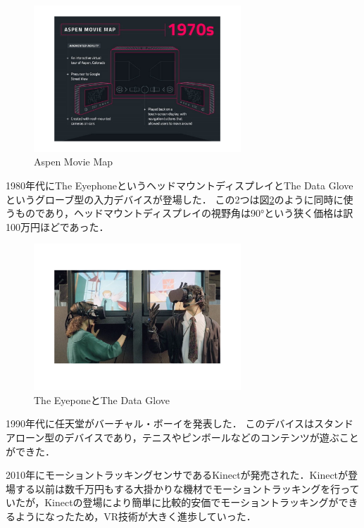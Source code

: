 \documentclass[12pt,a4j]{ltjsarticle}
\begin{document}
\begin{figure}[h]
\begin{center}
 \includegraphics[clip,height=55mm]{Aspen_Movie_Map.pdf}
\end{center}
 \caption{Aspen Movie Map}
 \label{fig:Aspen_Movie_Map.pdf}
\end{figure}

1980年代にThe EyephoneというヘッドマウントディスプレイとThe Data Gloveというグローブ型の入力デバイスが登場した．
この2つは図\ref{fig:The_Eyephone.pdf}のように同時に使うものであり，ヘッドマウントディスプレイの視野角は90°という狭く価格は訳100万円ほどであった\cite{VRの機材}．

\begin{figure}[h]
\begin{center}
 \includegraphics[clip,height=55mm]{The_Eyephone.pdf}
\end{center}
 \caption{The EyeponeとThe Data Glove}
 \label{fig:The_Eyephone.pdf}
\end{figure}

1990年代に任天堂がバーチャル・ボーイを発表した．
このデバイスはスタンドアローン型のデバイスであり，テニスやピンボールなどのコンテンツが遊ぶことができた\cite{VRの機材}．

2010年にモーショントラッキングセンサであるKinectが発売された．Kinectが登場する以前は数千万円もする大掛かりな機材でモーショントラッキングを行っていたが，Kinectの登場により簡単に比較的安価でモーショントラッキングができるようになったため，VR技術が大きく進歩していった\cite{VRの機材}．
\end{document}
